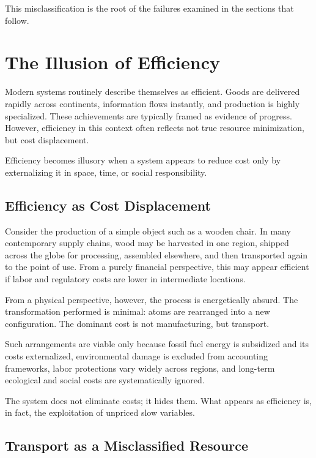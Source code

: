 \documentclass[12pt]{article} \usepackage[margin=1in]{geometry} \usepackage{setspace} \usepackage{amsmath,amssymb} \usepackage{hyperref}
\begin{document}
This misclassification is the root of the failures examined in the sections that follow.

\section{The Illusion of Efficiency}

Modern systems routinely describe themselves as efficient. Goods are delivered rapidly across continents, information flows instantly, and production is highly specialized. These achievements are typically framed as evidence of progress. However, efficiency in this context often reflects not true resource minimization, but cost displacement.

Efficiency becomes illusory when a system appears to reduce cost only by externalizing it in space, time, or social responsibility.

\subsection{Efficiency as Cost Displacement} 

Consider the production of a simple object such as a wooden chair. In many contemporary supply chains, wood may be harvested in one region, shipped across the globe for processing, assembled elsewhere, and then transported again to the point of use. From a purely financial perspective, this may appear efficient if labor and regulatory costs are lower in intermediate locations.

From a physical perspective, however, the process is energetically absurd. The transformation performed is minimal: atoms are rearranged into a new configuration. The dominant cost is not manufacturing, but transport.

Such arrangements are viable only because fossil fuel energy is subsidized and its costs externalized, environmental damage is excluded from accounting frameworks, labor protections vary widely across regions, and long-term ecological and social costs are systematically ignored.

The system does not eliminate costs; it hides them. What appears as efficiency is, in fact, the exploitation of unpriced slow variables.

\subsection{Transport as a Misclassified Resource} 
\end{document}
